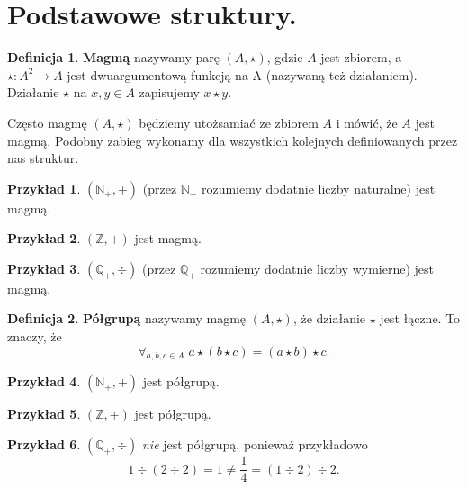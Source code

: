 \documentclass{book}
\theoremstyle{definition}
\newtheorem{definition}{Definicja}[section]
\newtheorem{example}{Przykład}[section]
\begin{document}
\section{Podstawowe struktury.}

\begin{definition}
	\textbf{Magmą} nazywamy parę $(A, \star)$, gdzie $A$ jest zbiorem, a $\star: A^2 \to A$ jest dwuargumentową funkcją na A (nazywaną też działaniem). Działanie $\star$ na $x, y \in A$ zapisujemy $x \star y$.
\end{definition}
Często magmę $(A, \star)$ będziemy utożsamiać ze zbiorem $A$ i mówić, że $A$ jest magmą.
Podobny zabieg wykonamy dla wszystkich kolejnych definiowanych przez nas struktur.

\begin{example}
	$(\mathbb{N}_+, +)$ (przez $\mathbb{N}_+$ rozumiemy dodatnie liczby naturalne) jest magmą.
\end{example}

\begin{example}
	$(\mathbb{Z}, +)$ jest magmą.
\end{example}

\begin{example}
	$(\mathbb{Q}_+, \div)$ (przez $\mathbb{Q}_+$ rozumiemy dodatnie liczby wymierne) jest magmą.
\end{example}

\begin{definition}
	\textbf{Półgrupą} nazywamy magmę $(A, \star)$, że działanie $\star$ jest łączne. To znaczy, że
	\begin{equation*}
		\forall_{a,b,c \in A}\; a \star (b \star c) = (a \star b) \star c.
	\end{equation*}
\end{definition}

\begin{example}
	$(\mathbb{N}_+, +)$ jest półgrupą.
\end{example}

\begin{example}
	$(\mathbb{Z}, +)$ jest półgrupą.
\end{example}

\begin{example}
	$(\mathbb{Q}_+, \div)$ \textit{nie} jest półgrupą, ponieważ przykładowo
	\begin{equation*}
		1 \div (2 \div 2) = 1 \neq \frac{1}{4} = (1\div2)\div2.
	\end{equation*}
\end{example}
\end{document}
